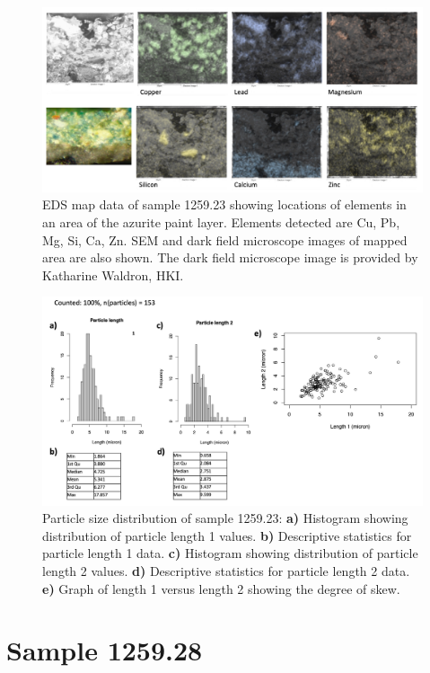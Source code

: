 \begin{figure}[H]
  \centering
  \includegraphics[width=0.8\linewidth]{1259.23_mapdata}
\caption[EDS map data, sample 1259.23.]{EDS map data of sample 1259.23 showing locations of elements in an area of the azurite paint layer. Elements detected are Cu, Pb, Mg, Si, Ca, Zn. SEM and dark field microscope images of mapped area are also shown. The dark field microscope image is provided by Katharine Waldron, HKI.}
\label{fig:1259.23_mapdata}
\end{figure}


\begin{figure}[H]
\centering
  \includegraphics[width=0.8\linewidth]{1259.23_partsize}
\caption[Particle size distribution, sample 1259.23.]{Particle size distribution of sample 1259.23: \textbf{a)} Histogram showing distribution of particle length 1 values. \textbf{b)} Descriptive statistics for particle length 1 data. \textbf{c)} Histogram showing distribution of particle length 2 values. \textbf{d)} Descriptive statistics for particle length 2 data. \textbf{e)} Graph of length 1 versus length 2 showing the degree of skew.}
\label{fig:1259.23_partsize}
\end{figure}



\section{Sample 1259.28}


